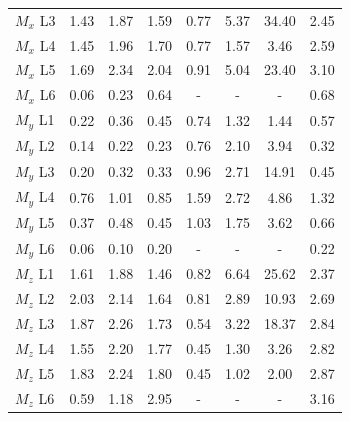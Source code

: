 \begin{table}[h]
\begin{tabular}{lccccccc}
$M_x$ L3 & 1.43 & 1.87 & 1.59 & 0.77 & 5.37 & 34.40 & 2.45 \\
$M_x$ L4 & 1.45 & 1.96 & 1.70 & 0.77 & 1.57 & 3.46 & 2.59 \\
$M_x$ L5 & 1.69 & 2.34 & 2.04 & 0.91 & 5.04 & 23.40 & 3.10 \\
$M_x$ L6 & 0.06 & 0.23 & 0.64 & - & - & - & 0.68 \\
$M_y$ L1 & 0.22 & 0.36 & 0.45 & 0.74 & 1.32 & 1.44 & 0.57 \\
$M_y$ L2 & 0.14 & 0.22 & 0.23 & 0.76 & 2.10 & 3.94 & 0.32 \\
$M_y$ L3 & 0.20 & 0.32 & 0.33 & 0.96 & 2.71 & 14.91 & 0.45 \\
$M_y$ L4 & 0.76 & 1.01 & 0.85 & 1.59 & 2.72 & 4.86 & 1.32 \\
$M_y$ L5 & 0.37 & 0.48 & 0.45 & 1.03 & 1.75 & 3.62 & 0.66 \\
$M_y$ L6 & 0.06 & 0.10 & 0.20 & - & - & - & 0.22 \\
$M_z$ L1 & 1.61 & 1.88 & 1.46 & 0.82 & 6.64 & 25.62 & 2.37 \\
$M_z$ L2 & 2.03 & 2.14 & 1.64 & 0.81 & 2.89 & 10.93 & 2.69 \\
$M_z$ L3 & 1.87 & 2.26 & 1.73 & 0.54 & 3.22 & 18.37 & 2.84 \\
$M_z$ L4 & 1.55 & 2.20 & 1.77 & 0.45 & 1.30 & 3.26 & 2.82 \\
$M_z$ L5 & 1.83 & 2.24 & 1.80 & 0.45 & 1.02 & 2.00 & 2.87 \\
$M_z$ L6 & 0.59 & 1.18 & 2.95 & - & - & - & 3.16 \\
\bottomrule
\end{tabular}
\end{table}
